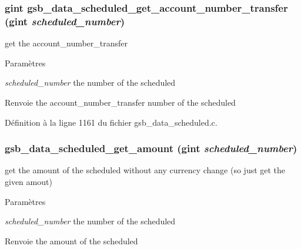 \subsubsection[{gsb\_\-data\_\-scheduled\_\-get\_\-account\_\-number\_\-transfer}]{\setlength{\rightskip}{0pt plus 5cm}gint gsb\_\-data\_\-scheduled\_\-get\_\-account\_\-number\_\-transfer (gint {\em scheduled\_\-number})}\label{gsb__data__scheduled_8h_ab6286df91402f557a522e8d6ff8b57c0}
get the account\_\-number\_\-transfer 
\begin{DoxyParams}{Paramètres}
\item[{\em scheduled\_\-number}]the number of the scheduled\end{DoxyParams}
\begin{DoxyReturn}{Renvoie}
the account\_\-number\_\-transfer number of the scheduled 
\end{DoxyReturn}


Définition à la ligne 1161 du fichier gsb\_\-data\_\-scheduled.c.

\subsubsection[{gsb\_\-data\_\-scheduled\_\-get\_\-amount}]{ gsb\_\-data\_\-scheduled\_\-get\_\-amount (gint {\em scheduled\_\-number})}\label{gsb__data__scheduled_8h_a60f83f62f6ca02e7b786ed30a1b9e6c6}
get the amount of the scheduled without any currency change (so just get the given amout)


\begin{DoxyParams}{Paramètres}
\item[{\em scheduled\_\-number}]the number of the scheduled\end{DoxyParams}
\begin{DoxyReturn}{Renvoie}
the amount of the scheduled 
\end{DoxyReturn}


